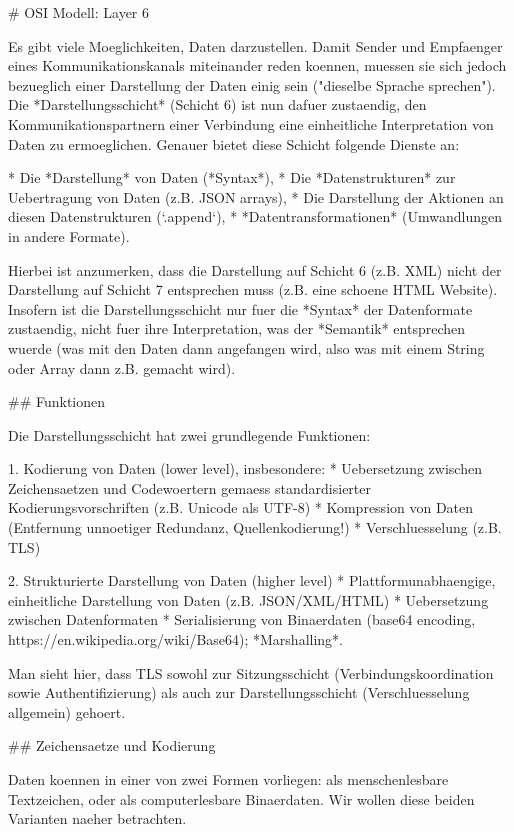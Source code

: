 # OSI Modell: Layer 6

Es gibt viele Moeglichkeiten, Daten darzustellen. Damit Sender und Empfaenger
eines Kommunikationskanals miteinander reden koennen, muessen sie sich jedoch
bezueglich einer Darstellung der Daten einig sein ("dieselbe Sprache
sprechen"). Die *Darstellungsschicht* (Schicht 6) ist nun dafuer zustaendig, den
Kommunikationspartnern einer Verbindung eine einheitliche Interpretation von
Daten zu ermoeglichen. Genauer bietet diese Schicht folgende Dienste an:

* Die *Darstellung* von Daten (*Syntax*),
* Die *Datenstrukturen* zur Uebertragung von Daten (z.B. JSON arrays),
* Die Darstellung der Aktionen an diesen Datenstrukturen (`.append`),
* *Datentransformationen* (Umwandlungen in andere Formate).

Hierbei ist anzumerken, dass die Darstellung auf Schicht 6 (z.B. XML) nicht der
Darstellung auf Schicht 7 entsprechen muss (z.B. eine schoene HTML
Website). Insofern ist die Darstellungsschicht nur fuer die *Syntax* der
Datenformate zustaendig, nicht fuer ihre Interpretation, was der *Semantik*
entsprechen wuerde (was mit den Daten dann angefangen wird, also was mit einem
String oder Array dann z.B. gemacht wird).

## Funktionen

Die Darstellungsschicht hat zwei grundlegende Funktionen:

1. Kodierung von Daten (lower level), insbesondere:
  * Uebersetzung zwischen Zeichensaetzen und Codewoertern gemaess
    standardisierter Kodierungsvorschriften (z.B. Unicode als UTF-8)
  * Kompression von Daten (Entfernung unnoetiger Redundanz, Quellenkodierung!)
  * Verschluesselung (z.B. TLS)

2. Strukturierte Darstellung von Daten (higher level)
 * Plattformunabhaengige, einheitliche Darstellung von Daten
   (z.B. JSON/XML/HTML)
 * Uebersetzung zwischen Datenformaten
 * Serialisierung von Binaerdaten (base64 encoding,
   https://en.wikipedia.org/wiki/Base64); *Marshalling*.

Man sieht hier, dass TLS sowohl zur Sitzungsschicht (Verbindungskoordination
sowie Authentifizierung) als auch zur Darstellungsschicht (Verschluesselung
allgemein) gehoert.

## Zeichensaetze und Kodierung

Daten koennen in einer von zwei Formen vorliegen: als menschenlesbare
Textzeichen, oder als computerlesbare Binaerdaten. Wir wollen diese beiden
Varianten naeher betrachten.

